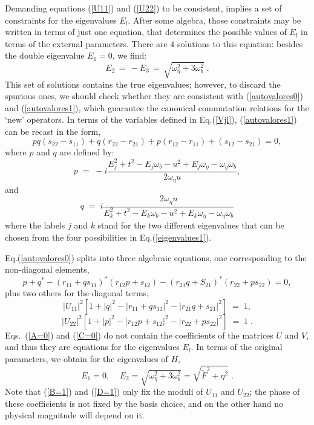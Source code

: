 \documentclass[a4paper,12pt]{article}
\newcommand{\Fd}{\widetilde{F}}
\newcommand{\n}{\eta}
\newcommand{\w}{\omega}
\begin{document}
Demanding equations (\ref{U11}) and (\ref{U22}) to be consistent,
implies a set of constraints for the eigenvalues $E_l$. After some
algebra, those constraints may be written in terms of just one
equation, that determines the possible values of $E_l$ in terms of the external
parameters. There are $4$ solutions to this equation: besides the
double eigenvalue $E_1=0$, we find:
  \begin{equation}
  E_2\,=\,-E_3\,=\,\sqrt{\w_\n^2+3\w_b^2}\;.
\label{eigenvalues1}
\end{equation}
This set of solutions contains the true eigenvalues; however, to
discard the spurious ones, we should check whether they are
consistent with (\ref{autovalores0}) and (\ref{autovalores1}), which
guarantee the canonical commutation relations for the `new' operators.
In terms of the variables defined in Eq.(\ref{Vjl}),
(\ref{autovalores1}) can be recast in the form,
\begin{equation}\label{A=0}
pq(s_{22}-s_{11})+q(r_{22}-r_{21})+p(r_{12}-r_{11})+(s_{12}-s_{21})=0,
\end{equation}
where $p$ and $q$ are defined by:
\begin{equation}\label{p}
p\;=\;-i\frac{E_j^2+t^2-E_j \w_b-u^2+E_j \w_\n-\w_\n \w_b}{2 \w_\n u},
\end{equation}
and
\begin{equation}\label{q}
q\;=\;i\frac{2 \w_\n u}{E_k^2+t^2-E_k \w_b-u^2+E_k \w_\n-\w_\n \w_b}
\end{equation}
where the labels $j$ and $k$ stand for the two different eigenvalues
that can be chosen from the four possibilities in
Eq.(\ref{eigenvalues1}).

Eq.(\ref{autovalores0}) splits into three algebraic equations, one
corresponding to the non-diagonal elements,
\begin{equation}\label{C=0}
p+q^*-(r_{11}+q s_{11})^*(r_{12}p+s_{12})-(r_{21}q+
S_{21})^*(r_{22}+p s_{22})=0,
\end{equation}
plus two others for the diagonal terms,
\begin{equation}\label{B=1} 
|U_{11}|^2[1+|q|^2-|r_{11}+q s_{11}|^2-|r_{21}q+s_{21}|^2]\;=\;1,
\end{equation}
\begin{equation}\label{D=1}
|U_{22}|^2[1+|p|^2-|r_{12}p+ s_{12}|^2-|r_{22}+p s_{22}|^2]\;=\;1\;.
\end{equation}
Eqs.~(\ref{A=0}) and (\ref{C=0}) do not contain the coefficients of
the matrices $U$ and $V$, and thus they are equations for the
eigenvalues $E_l$.  In terms of the original parameters, we obtain for
the eigenvalues of $H$,
\begin{equation}
E_1=0,\;\;\;\; E_2=\sqrt{\w_\n^2+3\w_b^2}=\sqrt{\Fd^2+\n^2}\;.
\end{equation}
Note that (\ref{B=1}) and (\ref{D=1}) only fix the moduli of $U_{11}$
and $U_{22}$; the phase of these coefficients is not fixed by the
basis choice, and on the other hand no physical magnitude will depend
on it.
\end{document}

